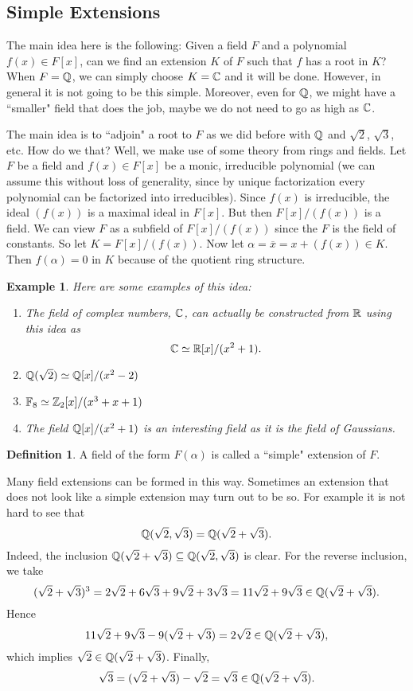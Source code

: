 \documentclass[12pt]{article}
\theoremstyle{plain}
\newtheorem{example}{Example}
\theoremstyle{definition}
\newtheorem{definition}{Definition}
\theoremstyle{remark}
\begin{document}
\subsection{Simple Extensions}
The main idea here is the following: Given a field $F$ and a polynomial $f(x) \in F[x]$, can we find an extension $K$ of $F$ such that $f$ has a root in $K$? When $F=\mathbb{Q}$, we can simply choose $K=\mathbb{C}$ and it will be done. However, in general it is not going to be this simple. Moreover, even for $\mathbb{Q}$, we might have a ``smaller" field that does the job, maybe we do not need to go as high as $\mathbb{C}$. 

The main idea is to ``adjoin" a root to $F$ as we did before with $\mathbb{Q}$ and $\sqrt{2}$, $\sqrt{3}$, etc. How do we that? Well, we make use of some theory from rings and fields. Let $F$ be a field and $f(x)\in F[x]$ be a monic, irreducible polynomial (we can assume this without loss of generality, since by unique factorization every polynomial can be factorized into irreducibles). Since $f(x)$ is irreducible, the ideal $(f(x))$ is a maximal ideal in $F[x]$. But then $F[x]/(f(x))$ is a field. We can view $F$ as a subfield of $F[x]/(f(x))$ since the $F$ is the field of constants. So let $K=F[x]/(f(x))$. Now let $\alpha = \overline{x}=x+(f(x))\in K$. Then $f(\alpha)=0$ in $K$ because of the quotient ring structure.
\begin{example}
Here are some examples of this idea:
\begin{enumerate}
    \item The field of complex numbers, $\mathbb{C}$, can actually be constructed from $\mathbb{R}$ using this idea as 
    $$\mathbb{C}\simeq \mathbb{R}[x]/(x^2+1).$$
    \item $\mathbb{Q}(\sqrt{2})\simeq \mathbb{Q}[x]/(x^2-2)$
    \item $\mathbb{F}_8\simeq \mathbb{Z}_2[x]/(x^3+x+1)$
    \item The field $\mathbb{Q}[x]/(x^2+1)$ is an interesting field as it is the field of Gaussians. 
\end{enumerate}
\end{example}

\begin{definition}
A field of the form $F(\alpha)$ is called a ``simple" extension of $F$. 
\end{definition}
Many field extensions can be formed in this way. Sometimes an extension that does not look like a simple extension may turn out to be so. For example it is not hard to see that 
$$\mathbb{Q}(\sqrt{2}, \sqrt{3}) =\mathbb{Q}(\sqrt{2}+\sqrt{3}).$$
Indeed, the inclusion $\mathbb{Q}(\sqrt{2}+\sqrt{3}) \subseteq \mathbb{Q}(\sqrt{2}, \sqrt{3})$ is clear. For the reverse inclusion, 
we take 
$$(\sqrt{2}+\sqrt{3})^3 = 2\sqrt{2}+6\sqrt{3}+9\sqrt{2}+3\sqrt{3} = 11\sqrt{2}+9\sqrt{3} \in \mathbb{Q}(\sqrt{2}+\sqrt{3}).$$
Hence 
$$11\sqrt{2}+9\sqrt{3}-9(\sqrt{2}+\sqrt{3}) = 2\sqrt{2}\in \mathbb{Q}(\sqrt{2}+\sqrt{3}),$$
which implies $\sqrt{2} \in \mathbb{Q}(\sqrt{2}+\sqrt{3})$. 
Finally, 
$$\sqrt{3}=(\sqrt{2}+\sqrt{3})-\sqrt{2} = \sqrt{3}\in \mathbb{Q}(\sqrt{2}+\sqrt{3}).$$
\end{document}

